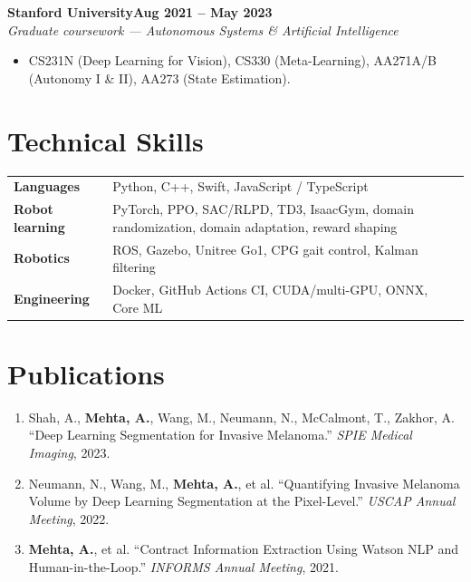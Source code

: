 \documentclass[10pt]{article}
\newcommand{\role}[4]{\textbf{#1}\hfill\textbf{#2}\\\textit{#3}\hfill\textit{#4}}
\begin{document}
\role{Stanford University}{Aug 2021 -- May 2023}{Graduate coursework --- Autonomous Systems \& Artificial Intelligence}{}
\begin{itemize}
\item CS231N (Deep Learning for Vision), CS330 (Meta-Learning), AA271A/B (Autonomy I \& II), AA273 (State Estimation).
\end{itemize}

\section*{Technical Skills}
\begin{tabular}{@{}p{0.9in}l}
\textbf{Languages} & Python, C++, Swift, JavaScript / TypeScript \\
\textbf{Robot learning} & PyTorch, PPO, SAC/RLPD, TD3, IsaacGym, domain randomization, domain adaptation, reward shaping \\
\textbf{Robotics} & ROS, Gazebo, Unitree Go1, CPG gait control, Kalman filtering \\
\textbf{Engineering} & Docker, GitHub Actions CI, CUDA/multi-GPU, ONNX, Core ML \\
\end{tabular}

\section*{Publications}
\begin{enumerate}[leftmargin=1.4em,itemsep=1pt,topsep=1pt]
\item Shah, A., \textbf{Mehta, A.}, Wang, M., Neumann, N., McCalmont, T., Zakhor, A. ``Deep Learning Segmentation for Invasive Melanoma.'' \textit{SPIE Medical Imaging}, 2023.
\item Neumann, N., Wang, M., \textbf{Mehta, A.}, et al. ``Quantifying Invasive Melanoma Volume by Deep Learning Segmentation at the Pixel-Level.'' \textit{USCAP Annual Meeting}, 2022.
\item \textbf{Mehta, A.}, et al. ``Contract Information Extraction Using Watson NLP and Human-in-the-Loop.'' \textit{INFORMS Annual Meeting}, 2021.
\end{enumerate}
\end{document}

